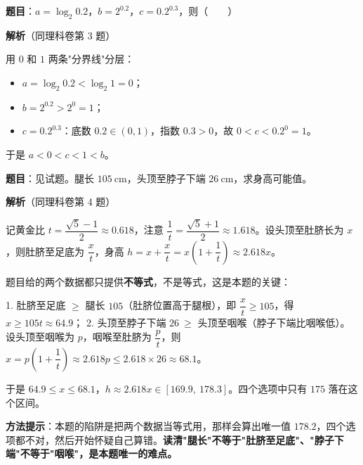 
\textbf{题目}：$a=\log_2 0.2$，$b=2^{0.2}$，$c=0.2^{0.3}$，则（　　）

\textbf{解析}（同理科卷第 3 题）

用 $0$ 和 $1$ 两条"分界线"分层：

\begin{itemize}
\item $a=\log_2 0.2<\log_2 1=0$；
\item $b=2^{0.2}>2^{0}=1$；
\item $c=0.2^{0.3}$：底数 $0.2\in(0,1)$，指数 $0.3>0$，故 $0<c<0.2^{0}=1$。
\end{itemize}

于是 $a<0<c<1<b$。


\par\medskip


\textbf{题目}：见试题。腿长 $105\ \mathrm{cm}$，头顶至脖子下端 $26\ \mathrm{cm}$，求身高可能值。

\textbf{解析}（同理科卷第 4 题）

记黄金比 $t=\dfrac{\sqrt5-1}2\approx0.618$，注意 $\dfrac1t=\dfrac{\sqrt5+1}2\approx1.618$。设头顶至肚脐长为 $x$，则肚脐至足底为 $\dfrac xt$，身高 $h=x+\dfrac xt=x\left(1+\dfrac1t\right)\approx2.618x$。

题目给的两个数据都只提供\textbf{不等式}，不是等式，这是本题的关键：

1. 肚脐至足底 $\ge$ 腿长 $105$（肚脐位置高于腿根），即 $\dfrac xt\ge105$，得 $x\ge105t\approx64.9$；
2. 头顶至脖子下端 $26\ \ge$ 头顶至咽喉（脖子下端比咽喉低）。设头顶至咽喉为 $p$，咽喉至肚脐为 $\dfrac pt$，则 $x=p\left(1+\dfrac1t\right)\approx2.618p\le2.618\times26\approx68.1$。

于是 $64.9\le x\le68.1$，$h\approx2.618x\in[169.9,\ 178.3]$。四个选项中只有 $175$ 落在这个区间。


\begin{gktip}
\textbf{方法提示}：本题的陷阱是把两个数据当等式用，那样会算出唯一值 $178.2$，四个选项都不对，然后开始怀疑自己算错。\textbf{读清"腿长"不等于"肚脐至足底"、"脖子下端"不等于"咽喉"，是本题唯一的难点。}
\end{gktip}

\par\medskip


